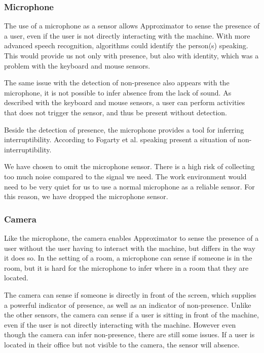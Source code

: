 \documentclass{sigchi}
\begin{document}
\subsubsection{Microphone}
The use of a microphone as a sensor allows Approximator to sense the presence of a user, even if the user is not directly interacting with the machine.
With more advanced speech recognition, algorithms could identify the person(s) speaking.
This would provide us not only with presence, but also with identity, which was a problem with the keyboard and mouse sensors.

The same issue with the detection of non-presence also appears with the microphone, it is not possible to infer absence from the lack of sound.
As described with the keyboard and mouse sensors, a user can perform activities that does not trigger the sensor, and thus be present without detection.

Beside the detection of presence, the microphone provides a tool for inferring interruptibility.
According to Fogarty et al. \cite{fogarty2005predicting} speaking present a situation of non-interruptibility.

We have chosen to omit the microphone sensor.
There is a high risk of collecting too much noise compared to the signal we need.
The work environment would need to be very quiet for us to use a normal microphone as a reliable sensor.
For this reason, we have dropped the microphone sensor.

\subsubsection{Camera}
Like the microphone, the camera enables Approximator to sense the presence of a user without the user having to interact with the machine, but differs in the way it does so.
In the setting of a room, a microphone can sense if someone is in the room, but it is hard for the microphone to infer where in a room that they are located.

The camera can sense if someone is directly in front of the screen, which supplies a powerful indicator of presence, as well as an indicator of non-presence.
Unlike the other sensors, the camera can sense if a user is sitting in front of the machine, even if the user is not directly interacting with the machine.
However even though the camera can infer non-presence, there are still some issues.
If a user is located in their office but not visible to the camera, the sensor will absence.
\end{document}
